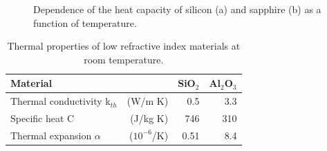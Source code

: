 \begin{figure}[h!]
\begin{center}
\caption{Dependence of the heat capacity of silicon (a) and sapphire (b) as a function of temperature.}
\end{center}
\label{fig:app_Cp}
\end{figure}

\begin{table}[h!]
\begin{center}
\begin{tabular}{|l r||r|r|}
  \hline
    {\large\strut} Material  & & SiO$_2$ & Al$_2$O$_3$ \\
  \hline
  \hline
   {\large\strut} Thermal conductivity k$_{th}$ & (W/m K) & 0.5  & 3.3 \\
   {\large\strut} Specific heat C & (J/kg K) & 746  & 310 \\
   {\large\strut} Thermal expansion $\alpha$ & ($10^{-6}$/K) &  0.51  & 8.4 \\
    \hline
\end{tabular}
\caption{Thermal properties of low refractive index materials at room temperature.}
\end{center}
\label{tab:Therm_CoatLowRef_Param}
\end{table}

